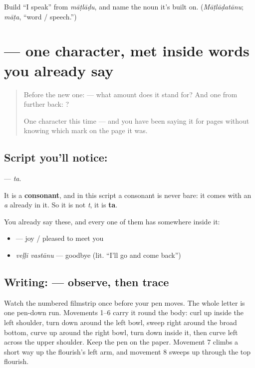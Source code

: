 \begin{tcolorbox}[breakable,colback=teal!4,colframe=teal!35!black,title={Before you move on}]
Build \textquotedblleft{}I speak\textquotedblright{} from \emph{māṭlāḍu}, and name the noun it's built on. (\emph{Māṭlāḍatānu}; \emph{māṭa}, \textquotedblleft{}word / speech.\textquotedblright{})
\end{tcolorbox}
\section[\texorpdfstring{\te{త} (ta)}{త (ta)}]{ — one character, met inside words you already say}

\label{lesson:TE-S01-letter-ta}



\begin{quote}
Before the new one:  — what amount does it stand for? And one from further back: ?

One character this time — and you have been saying it for pages without knowing which mark on the page it was.
\end{quote}

\subsection*{Script you'll notice: }
\textbf{} — \emph{ta}.

It is a \textbf{consonant}, and in this script a consonant is never bare: it comes with an \emph{a} already in it. So it is not \emph{t}, it is \textbf{ta}.

You already say these, and every one of them has  somewhere inside it:

\begin{itemize}
\raggedright
  \item \textbf{} — joy / pleased to meet you
  \item \textbf{ } \emph{veḷḷi vastānu} — goodbye (lit. \textquotedblleft{}I'll go and come back\textquotedblright{})
\end{itemize}

\subsection*{Writing:  — observe, then trace}

Watch the numbered filmstrip once before your pen moves. The whole letter is one pen-down run. Movements 1–6 carry it round the body: curl up inside the left shoulder, turn down around the left bowl, sweep right around the broad bottom, curve up around the right bowl, turn down inside it, then curve left across the upper shoulder. Keep the pen on the paper. Movement 7 climbs a short way up the flourish's left arm, and movement 8 sweeps up through the top flourish.

